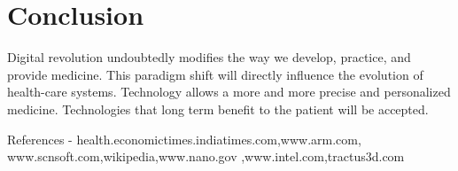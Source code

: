 \documentclass[11pt]{article}
\begin{document}
\section{\huge Conclusion}
\raggedright Digital revolution undoubtedly modifies the way we develop, practice, and provide medicine. This paradigm shift will directly influence the evolution of health-care systems. Technology allows a more and more precise and personalized medicine. Technologies that long term benefit to the patient will be accepted.










\Large References -
health.economictimes.indiatimes.com,www.arm.com, www.scnsoft.com,wikipedia,www.nano.gov ,www.intel.com,tractus3d.com\
\end{document}
